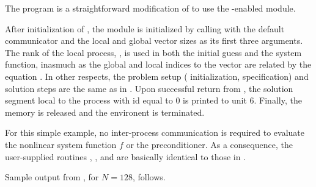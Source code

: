 The program  is a straightforward modification of 
 to use the {\mpi}-enabled {\nvecp} module.

After initialization of {\mpi}, the {\nvecp} module is initialized by calling
 with the default {\mpi} communicator  and
the local and global vector sizes as its first three arguments.
The rank of the local process, , is used in both the initial guess
and the system function, inasmuch as the global and local indices to
the vector  are related by the equation .
In other respects, the problem setup ({\kinsol} initialization,
{\sunlinsolspgmr} specification) and solution steps are the same as in
.  Upon successful return from , the
solution segment local to the process with id equal to $0$ is printed
to unit 6. Finally, the {\kinsol} memory is released and the {\mpi}
environent is terminated. 

For this simple example, no inter-process communication is required to
evaluate the nonlinear system function $f$ or the preconditioner. 
As a consequence, the user-supplied routines , , and
 are basically identical to those in .

Sample output from , for $N=128$, follows.

